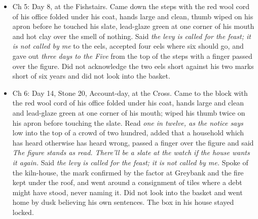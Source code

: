 \documentclass{design/chronicle}
\begin{document}
{\begin{itemize}[leftmargin=1.4em,itemsep=1pt,topsep=3pt,parsep=0pt]
\end{itemize}

\begin{itemize}[leftmargin=1.4em,itemsep=1pt,topsep=3pt,parsep=0pt]

\item Ch 5: Day 8, at the Fishstairs. Came down the steps with the red wool cord of his office folded under his coat, hands large and clean, thumb wiped on his apron before he touched his slate, lead-glaze green at one corner of his mouth and hot clay over the smell of nothing. Said \emph{the levy is called for the feast; it is not called by me} to the eels, accepted four eels where six should go, and gave out \emph{three days to the Five} from the top of the steps with a finger passed over the figure. Did not acknowledge the two eels short against his two marks short of six years and did not look into the basket.

\end{itemize}

\begin{itemize}[leftmargin=1.4em,itemsep=1pt,topsep=3pt,parsep=0pt]

\item Ch 6: Day 14, Stone 20, Account-day, at the Cross. Came to the block with the red wool cord of his office folded under his coat, hands large and clean and lead-glaze green at one corner of his mouth; wiped his thumb twice on his apron before touching the slate. Read \emph{one in twelve, as the notice says} low into the top of a crowd of two hundred, added that a household which has heard otherwise has heard wrong, passed a finger over the figure and said \emph{The figure stands as read. There’ll be a slate at the watch if the house wants it again.} Said \emph{the levy is called for the feast; it is not called by me.} Spoke of the kiln-house, the mark confirmed by the factor at Greybank and the fire kept under the roof, and went around a consignment of tiles where a debt might have stood, never naming it. Did not look into the basket and went home by dusk believing his own sentences. The box in his house stayed locked.

\end{itemize}

\begin{itemize}[leftmargin=1.4em,itemsep=1pt,topsep=3pt,parsep=0pt]


\end{itemize}}
\end{document}
